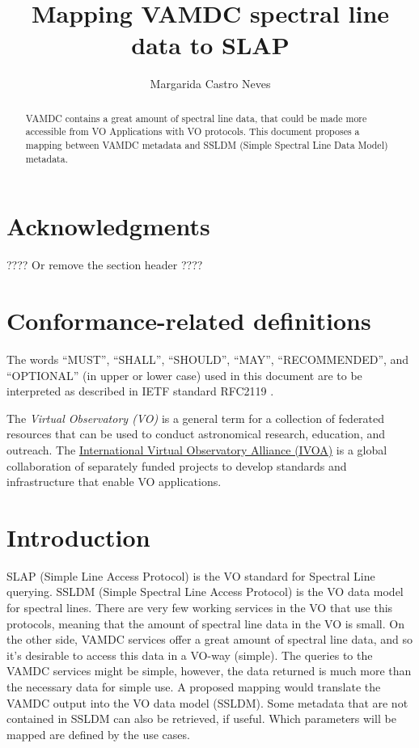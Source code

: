\documentclass[11pt,a4paper]{ivoa}
\title{Mapping VAMDC spectral line data to SLAP}
\author{Margarida Castro Neves}
\begin{document}
\begin{abstract}
VAMDC contains  a great amount of spectral line data, that could be made more
accessible from VO Applications with  VO protocols. This document proposes a mapping
between VAMDC metadata and SSLDM (Simple Spectral Line Data Model) metadata.
\end{abstract}


\section*{Acknowledgments}

???? Or remove the section header ????

\section*{Conformance-related definitions}

The words ``MUST'', ``SHALL'', ``SHOULD'', ``MAY'', ``RECOMMENDED'', and
``OPTIONAL'' (in upper or lower case) used in this document are to be
interpreted as described in IETF standard RFC2119 \citep{std:RFC2119}.

The \emph{Virtual Observatory (VO)} is a
general term for a collection of federated resources that can be used
to conduct astronomical research, education, and outreach.
The \href{http://www.ivoa.net}{International
Virtual Observatory Alliance (IVOA)} is a global
collaboration of separately funded projects to develop standards and
infrastructure that enable VO applications.


\section{Introduction}

SLAP (Simple Line Access Protocol) is the VO standard for Spectral Line querying. 
SSLDM (Simple Spectral Line Access Protocol) is the VO data model for spectral lines.
There are very few working services in the VO that use this protocols, meaning that the
amount of spectral line data in the VO is small. 
On the other side, VAMDC services offer a great amount of spectral line data, and 
so it's desirable to access this data in a VO-way (simple). 
The queries to the VAMDC services might be simple, however, the data returned is much more
than the necessary data for simple use.
A proposed mapping would translate the VAMDC output into the  VO data model (SSLDM). Some metadata that are not contained in SSLDM can also be retrieved, if useful. 
Which parameters  will be mapped are defined by the use cases.
\end{document}
